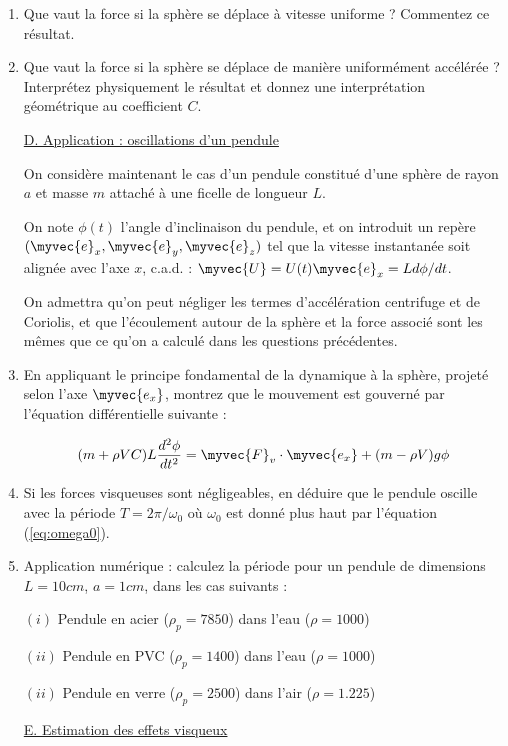 \begin{enumerate}
\item Que vaut la force si la sphère se déplace à vitesse uniforme ? Commentez ce résultat.

\item Que vaut la force si la sphère se déplace de manière uniformément accélérée ? Interprétez physiquement le résultat et donnez une interprétation géométrique au coefficient $C$.


\underline{D. Application : oscillations d'un pendule}

On considère maintenant le cas d'un pendule constitué d'une sphère de rayon $a$ et masse $m$ attaché à une ficelle de longueur $L$. 

On note $\phi(t)$ l'angle d'inclinaison du pendule, et on introduit un repère 
$(\myvec{e}_x, \myvec{e}_y, \myvec{e}_z)$ tel que la vitesse instantanée soit alignée avec l'axe $x$, c.a.d. : $\myvec{U} = U(t) \myvec{e}_x = L d \phi / dt$.

On admettra qu'on peut négliger les termes d'accélération centrifuge et de Coriolis, et que l'écoulement autour de la sphère et la force associé sont les mêmes que ce qu'on a calculé dans les questions précédentes.




\item En appliquant le principe fondamental de la dynamique à la sphère, projeté selon l'axe 
$\myvec{e_x}$, montrez que le mouvement est gouverné par l'équation différentielle suivante :

$$
(m+\rho VC) L
\frac{d^2 \phi}{d t^2} =  \myvec{F}_v \cdot \myvec{e_x} + (m-\rho V) g \phi
$$



\item Si les forces visqueuses sont négligeables, en déduire que le pendule oscille avec la période $T = 2\pi / \omega_0$ où $\omega_0$ est donné plus haut par l'équation (\ref{eq:omega0}).

\item 
Application numérique : calculez la période pour un pendule de dimensions $L=10cm$, $a=1cm$, dans les cas suivants :

$(i)$ Pendule en acier ($\rho_p = 7850$) dans l'eau ($\rho = 1000$)

$(ii)$ Pendule en PVC ($\rho_p = 1400$) dans l'eau ($\rho = 1000$)

$(ii)$ Pendule en verre ($\rho_p = 2500$) dans l'air ($\rho = 1.225$)

\underline{E. Estimation des effets visqueux}


\end{enumerate}
